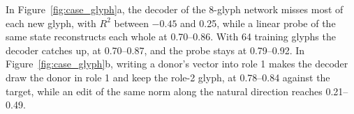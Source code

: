 In Figure~\ref{fig:case_glyph}a, the decoder of the 8-glyph network misses most of each new glyph, with $R^2$ between $-0.45$ and 0.25, while a linear probe of the same state reconstructs each whole at 0.70--0.86. With 64 training glyphs the decoder catches up, at 0.70--0.87, and the probe stays at 0.79--0.92. In Figure~\ref{fig:case_glyph}b, writing a donor's vector into role 1 makes the decoder draw the donor in role 1 and keep the role-2 glyph, at 0.78--0.84 against the target, while an edit of the same norm along the natural direction reaches 0.21--0.49.
\FloatBarrier

